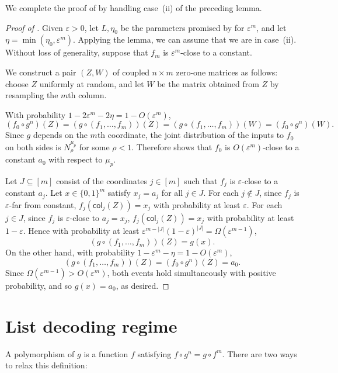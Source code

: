\documentclass{article}
\theoremstyle{definition}
\theoremstyle{remark}
\providecommand{\col}{\mathsf{col}}
\providecommand{\h}{g}
\newcommand\eps{\varepsilon}
\renewcommand\epsilon{\eps}
\begin{document}
We complete the proof of  by handling case~(ii) of the preceding lemma.

\begin{proof}[Proof of ]
Given $\epsilon > 0$, let $L,\eta_0$ be the parameters promised by  for $\epsilon^m$, and let $\eta = \min(\eta_0,\epsilon^m)$.
Applying the lemma, we can assume that we are in case~(ii). Without loss of generality, suppose that $f_m$ is $\epsilon^m$-close to a constant.

We construct a pair $(Z,W)$ of coupled $n \times m$ zero-one matrices as follows: choose $Z$ uniformly at random, and let $W$ be the matrix obtained from $Z$ by resampling the $m$th column.

With probability $1 - 2\epsilon^m - 2\eta = 1 - O(\epsilon^m)$,
\[
 (f_0 \circ g^n)(Z) = (\h \circ (f_1,\ldots,f_m))(Z) = (\h \circ (f_1,\ldots,f_m))(W) = (f_0 \circ g^n)(W).
\]
Since $g$ depends on the $m$th coordinate, the joint distribution of the inputs to $f_0$ on both sides is $N_\rho^{\mu_p}$ for some $\rho < 1$. Therefore  shows that $f_0$ is $O(\epsilon^m)$-close to a constant $a_0$ with respect to $\mu_p$.

Let $J \subseteq [m]$ consist of the coordinates $j \in [m]$ such that $f_j$ is $\epsilon$-close to a constant $a_j$. Let $x \in \{0,1\}^m$ satisfy $x_j = a_j$ for all $j \in J$. For each $j \notin J$, since $f_j$ is $\epsilon$-far from constant, $f_j(\col_j(Z)) = x_j$ with probability at least $\epsilon$. For each $j \in J$, since $f_j$ is $\epsilon$-close to $a_j = x_j$, $f_j(\col_j(Z)) = x_j$ with probability at least $1-\epsilon$. Hence with probability at least $\epsilon^{m-|J|} (1-\epsilon)^{|J|} = \Omega(\epsilon^{m-1})$,
\[
 (\h \circ (f_1,\ldots,f_m))(Z) = \h(x).
\]
On the other hand, with probability $1 - \epsilon^m - \eta = 1- O(\epsilon^m)$,
\[
 (\h \circ (f_1,\ldots,f_m))(Z) = (f_0 \circ g^n)(Z) = a_0.
\]
Since $\Omega(\epsilon^{m-1}) > O(\epsilon^m)$, both events hold simultaneously with positive probability, and so $\h(x) = a_0$, as desired.
\end{proof}

\section{List decoding regime}
\label{sec:list-decoding}

A polymorphism of $g$ is a function $f$ satisfying $f \circ g^n = g \circ f^m$. There are two ways to relax this definition:
\end{document}
